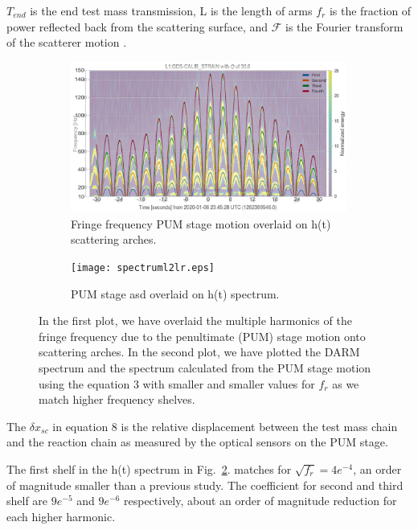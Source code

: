 \documentclass[12pt]{iopart}
\begin{document}
$T_{end}$ is the end test mass transmission, L is the length of arms $f_{r}$ is the fraction of power reflected back from the scattering surface, and $\mathcal{F}$ is the Fourier transform of the scatterer motion \cite{vaj_scat}.
\begin{figure}[h]
   \centering
    \begin{subfigure}[b]{0.45\textwidth}
        \centering
         \includegraphics[width= \textwidth]{fringel2b_lr.eps}
         \caption{Fringe frequency PUM stage motion overlaid on h(t) scattering arches.}
         \label{fig:fringel2}
    \end{subfigure}
    \hfill
    \begin{subfigure}[b]{0.45\textwidth}
        \centering
         \texttt{[image: spectruml2lr.eps]}
         \caption{PUM stage asd overlaid on h(t) spectrum.}
         \label{fig:spectruml2}
         
    
    \end{subfigure}
    \caption{In the first plot, we have overlaid the multiple harmonics of the fringe frequency due to the penultimate (PUM) stage motion onto scattering arches. In the second plot, we have plotted the DARM spectrum and the spectrum calculated from the PUM stage motion using the equation 3 with smaller and smaller values for $f_{r}$ as we match higher frequency shelves.}
    \label{fig:fringespectrum}
    
\end{figure}

The $\delta x_{sc} $ in equation 8 is the relative displacement between the test mass chain and the reaction chain as measured by the optical sensors on the PUM stage. 

The first shelf in the h(t) spectrum in Fig.~\ref{fig:spectruml2}. matches for $\sqrt{f_{r}} = 4e^{-4}$, an order of magnitude smaller than a previous study\cite{hiro_calc}. The coefficient for second and third shelf are $9e^{-5}$ and $9e^{-6}$ respectively, about an order of magnitude reduction for each higher harmonic.
\end{document}
